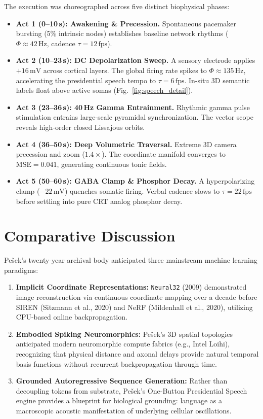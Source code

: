 \documentclass[10pt,twocolumn,a4paper]{article}
\begin{document}
The execution was choreographed across five distinct biophysical phases:
\begin{itemize}\itemsep=1pt
    \item \textbf{Act 1 (0--10\,s): Awakening \& Precession.} Spontaneous pacemaker bursting (5\% intrinsic nodes) establishes baseline network rhythms ($\Phi \approx 42\,\text{Hz}$, cadence $\tau = 12\,\text{fps}$).
    \item \textbf{Act 2 (10--23\,s): DC Depolarization Sweep.} A sensory electrode applies $+16\,\text{mV}$ across cortical layers. The global firing rate spikes to $\Phi \approx 135\,\text{Hz}$, accelerating the presidential speech tempo to $\tau = 6\,\text{fps}$. In-situ 3D semantic labels float above active somas (Fig.~\ref{fig:speech_detail}).
    \item \textbf{Act 3 (23--36\,s): 40\,Hz Gamma Entrainment.} Rhythmic gamma pulse stimulation entrains large-scale pyramidal synchronization. The vector scope reveals high-order closed Lissajous orbits.
    \item \textbf{Act 4 (36--50\,s): Deep Volumetric Traversal.} Extreme 3D camera precession and zoom ($1.4\times$). The coordinate manifold converges to $\text{MSE} = 0.041$, generating continuous tonic fields.
    \item \textbf{Act 5 (50--60\,s): GABA Clamp \& Phosphor Decay.} A hyperpolarizing clamp ($-22\,\text{mV}$) quenches somatic firing. Verbal cadence slows to $\tau = 22\,\text{fps}$ before settling into pure CRT analog phosphor decay.
\end{itemize}

\section{Comparative Discussion}

Pe\v{s}ek's twenty-year archival body anticipated three mainstream machine learning paradigms:
\begin{enumerate}\itemsep=1pt
    \item \textbf{Implicit Coordinate Representations:} \texttt{Neural32} (2009) demonstrated image reconstruction via continuous coordinate mapping over a decade before SIREN (Sitzmann et al., 2020) and NeRF (Mildenhall et al., 2020), utilizing CPU-based online backpropagation.
    \item \textbf{Embodied Spiking Neuromorphics:} Pe\v{s}ek's 3D spatial topologies anticipated modern neuromorphic compute fabrics (e.g., Intel Loihi), recognizing that physical distance and axonal delays provide natural temporal basis functions without recurrent backpropagation through time.
    \item \textbf{Grounded Autoregressive Sequence Generation:} Rather than decoupling tokens from substrate, Pe\v{s}ek's One-Button Presidential Speech engine provides a blueprint for biological grounding: language as a macroscopic acoustic manifestation of underlying cellular oscillations.
\end{enumerate}
\end{document}
